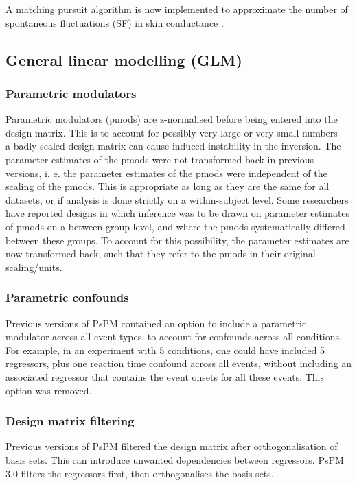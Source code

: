 \documentclass[english]{article}
\numberwithin{equation}{section}
\numberwithin{figure}{section}
\begin{document}
A matching pursuit algorithm is now implemented to approximate the
number of spontaneous fluctuations (SF) in skin conductance \cite{Bach:2015aa}.

\subsection*{General linear modelling (GLM)}

\subsubsection*{Parametric modulators}

Parametric modulators (pmods) are z-normalised before being entered
into the design matrix. This is to account for possibly very large
or very small numbers -- a badly scaled design matrix can cause induced
instability in the inversion. The parameter estimates of the pmods
were not transformed back in previous versions, i. e. the parameter
estimates of the pmods were independent of the scaling of the pmods.
This is appropriate as long as they are the same for all datasets,
or if analysis is done strictly on a within-subject level. Some researchers
have reported designs in which inference was to be drawn on parameter
estimates of pmods on a between-group level, and where the pmods systematically
differed between these groups. To account for this possibility, the
parameter estimates are now transformed back, such that they refer
to the pmods in their original scaling/units. 

\subsubsection*{Parametric confounds}

Previous versions of PsPM contained an option to include a parametric
modulator across all event types, to account for confounds across
all conditions. For example, in an experiment with 5 conditions, one
could have included 5 regressors, plus one reaction time confound
across all events, without including an associated regressor that
contains the event onsets for all these events. This option was removed. 

\subsubsection*{Design matrix filtering}

Previous versions of PsPM filtered the design matrix after orthogonalisation
of basis sets. This can introduce unwanted dependencies between regressors.
PsPM 3.0 filters the regressors first, then orthogonalises the basis
sets.
\end{document}
